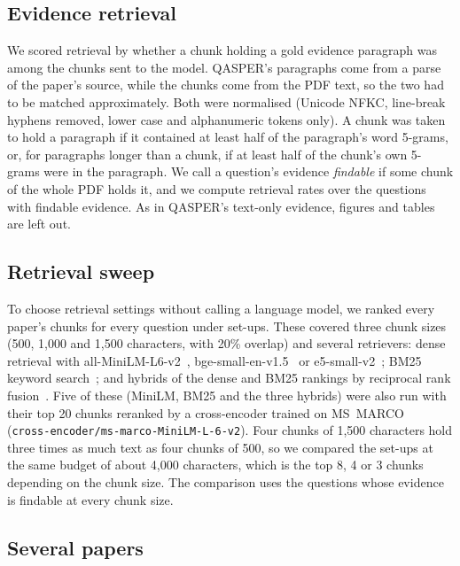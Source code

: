 \subsection{Evidence retrieval}
\label{sec:ev-evidence}

We scored retrieval by whether a chunk holding a gold evidence paragraph was among the chunks
sent to the model. QASPER's paragraphs come from a parse of the paper's source, while the chunks
come from the PDF text, so the two had to be matched approximately. Both were normalised
(Unicode NFKC, line-break hyphens removed, lower case and alphanumeric tokens only). A chunk was
taken to hold a paragraph if it contained at least half of the paragraph's word 5-grams, or, for
paragraphs longer than a chunk, if at least half of the chunk's own 5-grams were in the
paragraph. We call a question's evidence \emph{findable} if some chunk of the whole PDF holds it,
and we compute retrieval rates over the questions with findable evidence. As in QASPER's
text-only evidence, figures and tables are left out.

\subsection{Retrieval sweep}

To choose retrieval settings without calling a language model, we ranked every paper's chunks for
every question under \SweepSetups{} set-ups. These covered three chunk sizes (500, 1,000 and
1,500 characters, with 20\% overlap) and several retrievers: dense retrieval with
all-MiniLM-L6-v2~\cite{wang2020minilm}, bge-small-en-v1.5~\cite{xiao2023cpack} or
e5-small-v2~\cite{wang2022e5}; BM25 keyword search~\cite{robertson2009bm25}; and hybrids of the
dense and BM25 rankings by reciprocal rank fusion~\cite{cormack2009rrf}. Five of these (MiniLM,
BM25 and the three hybrids) were also run with their top 20 chunks reranked by a cross-encoder
trained on MS~MARCO~\cite{nogueira2019rerank,bajaj2016msmarco}
(\texttt{cross-encoder/ms-marco-MiniLM-L-6-v2}). Four chunks of 1,500 characters hold three
times as much text as four chunks of 500, so we compared the set-ups at the same budget of about
4,000 characters, which is the top 8, 4 or 3 chunks depending on the chunk size. The comparison
uses the \SweepQuestions{} questions whose evidence is findable at every chunk size.

\subsection{Several papers}

